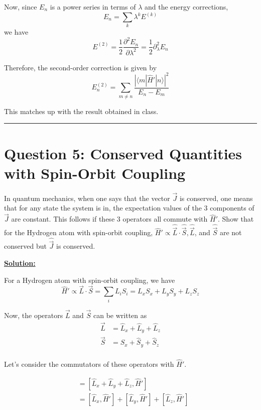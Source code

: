 \documentclass{article}
\newcommand{\inner}[2]{\langle #1 | #2 \rangle}
\begin{document}
\begin{enumerate}[label=(\alph*)]
  Now, since $E_n$ is a power series in terms of $\lambda$ and the energy corrections,
  \[ E_n = \sum_{k} \lambda^k E^{(k)} \]
  we have 
  \[ E^{(2)} = \frac{1}{2} \frac{\partial^2 E_n}{\partial \lambda^2} = \frac{1}{2} \partial^2_{\lambda} E_n \]

  Therefore, the second-order correction is given by 
  \[ E_{n}^{(2)} = \sum_{m \neq n} \frac{\left| \inner{m}{\hat{H}'|n} \right|^2}{E_n - E_m} \]
  
  This matches up with the result obtained in class.
\end{enumerate}

\vskip 0.5cm 
\hrule 
\vskip 0.5cm
\pagebreak


\section*{Question 5: Conserved Quantities with Spin-Orbit Coupling}

In quantum mechanics, when one says that the vector $\vec{J}$ is conserved, one means that for any state the system is in, the expectation values of the $3$ components of $\vec{J}$ are constant. This follows if these $3$ operators all commute with $\hat{H}'$. Show that for the Hydrogen atom with spin-orbit coupling, $\hat{H}' \propto \hat{\vec{L}} \cdot \hat{\vec{S}}, \hat{\vec{L}}$, and $\hat{\vec{S}}$ are not conserved but $\hat{\vec{J}}$ is conserved.

\vskip 0.5cm
\underline{\textbf{Solution:}} 

For a Hydrogen atom with spin-orbit coupling, we have 
\[ \hat{H}' \propto \vec{L} \cdot \vec{S} = \sum_i L_i S_i = L_x S_x + L_y S_y + L_z S_z \]


Now, the operators $\vec{L}$ and $\vec{S}$ can be written as 
\begin{align*}
  \vec{L} &= \hat{L}_x + \hat{L}_y + \hat{L}_z \\ 
  \vec{S} &= \hat{S}_x + \hat{S}_y + \hat{S}_z \\ 
\end{align*}

Let's consider the commutators of these operators with $\hat{H}'$.

\begin{align*}
  [\vec{L}, \hat{H}'] &= [\hat{L}_x + \hat{L}_y + \hat{L}_z, \hat{H}'] \\
  &= [\hat{L}_x, \hat{H}'] + [\hat{L}_y, \hat{H}'] + [\hat{L}_z, \hat{H}'] 
\end{align*}
\end{document}
